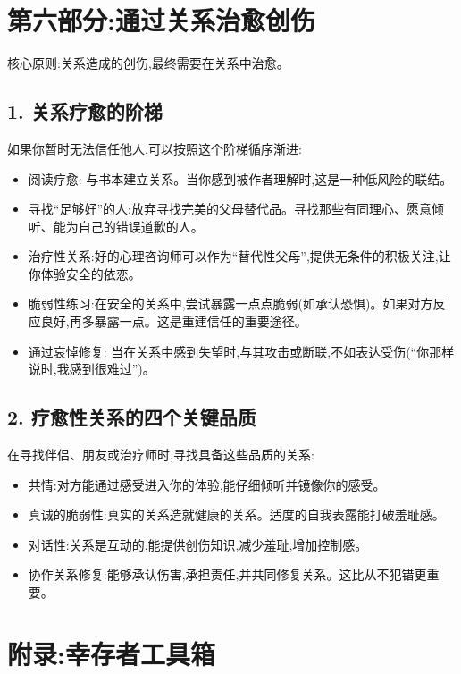 \documentclass[11pt, a4paper]{article}
\begin{document}
\newpage

\section{第六部分:通过关系治愈创伤}

核心原则:关系造成的创伤,最终需要在关系中治愈。

\subsection*{1. 关系疗愈的阶梯}
如果你暂时无法信任他人,可以按照这个阶梯循序渐进:
\begin{itemize}
    \item 阅读疗愈: 与书本建立关系。当你感到被作者理解时,这是一种低风险的联结。
    \item 寻找“足够好”的人:放弃寻找完美的父母替代品。寻找那些有同理心、愿意倾听、能为自己的错误道歉的人。
    \item 治疗性关系:好的心理咨询师可以作为“替代性父母”,提供无条件的积极关注,让你体验安全的依恋。
    \item 脆弱性练习:在安全的关系中,尝试暴露一点点脆弱(如承认恐惧)。如果对方反应良好,再多暴露一点。这是重建信任的重要途径。
    \item 通过哀悼修复: 当在关系中感到失望时,与其攻击或断联,不如表达受伤(“你那样说时,我感到很难过”)。
\end{itemize}

\subsection*{2. 疗愈性关系的四个关键品质}
在寻找伴侣、朋友或治疗师时,寻找具备这些品质的关系:
\begin{itemize}
    \item 共情:对方能通过感受进入你的体验,能仔细倾听并镜像你的感受。
    \item 真诚的脆弱性:真实的关系造就健康的关系。适度的自我表露能打破羞耻感。
    \item 对话性:关系是互动的,能提供创伤知识,减少羞耻,增加控制感。
    \item 协作关系修复:能够承认伤害,承担责任,并共同修复关系。这比从不犯错更重要。
\end{itemize}

\newpage

\section{附录:幸存者工具箱}
\end{document}

